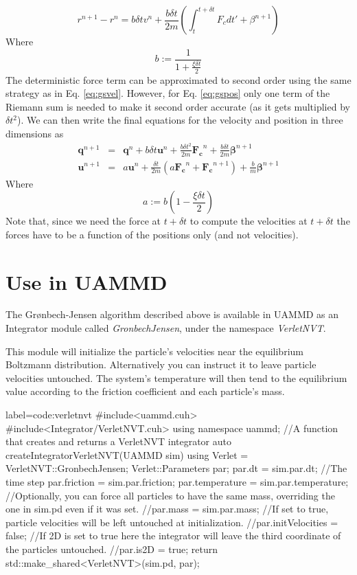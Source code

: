 \documentclass[ twoside,openright,titlepage,numbers=noenddot,%
headinclude,footinclude,cleardoublepage=empty,abstract=on,
BCOR=5mm,paper=b5,fontsize=11pt, dvipsnames
]{scrreprt}
\renewcommand{\vec}[1]{\bm{#1}}
\newcommand{\uammd}{\gls{UAMMD}\xspace}
\newcommand{\dt}{\delta t}
\newcommand{\ppos}{q}
\newcommand{\pvel}{u}
\begin{document}
\begin{equation}
  \label{eq:gspos}
  r^{n+1} - r^n =  b \dt v^n + \frac{b\dt}{2m}\left(\int_t^{t+\dt}F_cdt' + \beta^{n+1}\right)
\end{equation}
Where
\begin{equation}
b := \frac{1}{1+\frac{\xi\dt}{2}}
\end{equation}
The deterministic force term can be approximated to second order using the same strategy as in Eq. \eqref{eq:gsvel}. However, for Eq. \eqref{eq:gspos} only one term of the Riemann sum is needed to make it second order accurate (as it gets multiplied by $\dt^2$). We can then write the final equations for the velocity and position in three dimensions as
\begin{eqnarray}
  \label{eq:gsfinal}
  \vec{\ppos}^{n+1}  &=&  \vec{\ppos}^n + b \dt \vec{\pvel}^n + \frac{b\dt^2}{2m}\vec{F_c}^n + \frac{b\dt}{2m}\vec{\beta}^{n+1}\\
  \vec{\pvel}^{n+1} &=& a\vec{\pvel}^n + \frac{\dt}{2m}\left(a\vec{F_c}^n + \vec{F_c} ^{n+1}\right) +  \frac{b}{m}\vec{\beta}^{n+1}
\end{eqnarray}
Where
\begin{equation}
  a:=b \left(1-\frac{\xi\dt}{2}\right)
\end{equation}
Note that, since we need the force at $t+\dt$ to compute the velocities at $t+\dt$ the forces have to be a function of the positions only (and not velocities).

\section*{Use in UAMMD}
The Grønbech-Jensen algorithm described above is available in \uammd as an Integrator module called \emph{GronbechJensen}, under the namespace \emph{VerletNVT}.

This module will initialize the particle's velocities near the equilibrium Boltzmann distribution.
Alternatively you can instruct it to leave particle velocities untouched. The system's temperature will then tend to the equilibrium value according to the friction coefficient and each particle's mass.

\begin{code2}{label=code:verletnvt}
#include<uammd.cuh>
#include<Integrator/VerletNVT.cuh>
using namespace uammd;
//A function that creates and returns a VerletNVT integrator
auto createIntegratorVerletNVT(UAMMD sim){
  using Verlet = VerletNVT::GronbechJensen;
  Verlet::Parameters par;
  par.dt = sim.par.dt; //The time step
  par.friction = sim.par.friction;
  par.temperature = sim.par.temperature; 
  //Optionally, you can force all particles to have the same mass, overriding the one in sim.pd even if it was set.
  //par.mass = sim.par.mass;
  //If set to true, particle velocities will be left untouched at initialization.
  //par.initVelocities = false;
  //If 2D is set to true here the integrator will leave the third coordinate of the particles untouched.
  //par.is2D = true;
  return std::make_shared<VerletNVT>(sim.pd, par);
}
\end{code2}
\end{document}
